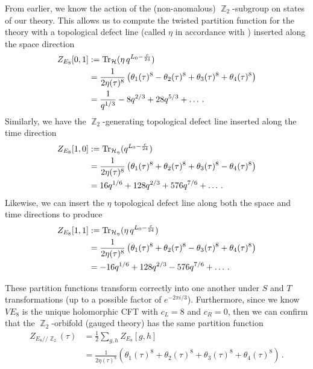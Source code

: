 \documentclass{article}
\DeclareMathOperator{\bbZ}{\mathbb{Z}}
\begin{document}
From earlier, we know the action of the (non-anomalous) $\bbZ_2$-subgroup on states of our theory. This allows us to compute the twisted partition function for the theory with a topological defect line (called $\eta$ in accordance with \cite{monsterCFT}) inserted along the space direction
\begin{align}
    Z_{E_8}[0,1] 
        &:= \Tr_{\mathcal{H}}( \eta \, q^{L_0-\frac{c}{24}})\\
        &= \frac{1}{2\eta(\tau)^8} \left(\theta_1(\tau)^8 - \theta_2(\tau)^8 + \theta_3(\tau)^8 + \theta_4(\tau)^8\right)\\
        &= \frac{1}{q^{1/3}} - 8 q^{2/3} + 28 q^{5/3} + \dots\,.
\end{align}
Similarly, we have the $\bbZ_2$-generating topological defect line inserted along the time direction
\begin{align}
    Z_{E_8}[1,0]
        &:= \Tr_{\mathcal{H}_\eta}(q^{L_0-\frac{c}{24}})\\
        &= \frac{1}{2\eta(\tau)^8} \left(\theta_1(\tau)^8 + \theta_2(\tau)^8 + \theta_3(\tau)^8 - \theta_4(\tau)^8\right)\\
        &= 16q^{1/6} + 128 q^{2/3} + 576 q^{7/6} + \dots\,.
\end{align}
Likewise, we can insert the $\eta$ topological defect line along both the space and time directions to produce
\begin{align}
    Z_{E_8}[1,1]
        &:= \Tr_{\mathcal{H}_\eta}( \eta \, q^{L_0-\frac{c}{24}})\\
        &= \frac{1}{2\eta(\tau)^8} \left(\theta_1(\tau)^8 + \theta_2(\tau)^8 - \theta_3(\tau)^8 + \theta_4(\tau)^8\right)\\
        &= -16q^{1/6} + 128 q^{2/3} - 576 q^{7/6} + \dots\,.
\end{align}

These partition functions transform correctly into one another under $S$ and $T$ transformations (up to a possible factor of $e^{-2\pi i/3}$). Furthermore, since we know $VE_8$ is the unique holomorphic CFT with $c_L = 8$ and $c_R = 0$, then we can confirm that the $\bbZ_2$-orbifold (gauged theory) has the same partition function
\begin{align}
    Z_{E_8//\bbZ_2}(\tau) 
        &= \frac{1}{2} \sum_{g,h} Z_{E_8}[g,h]\\
        &= \frac{1}{2\eta(\tau)^8} \left(\theta_1(\tau)^8 + \theta_2(\tau)^8 + \theta_3(\tau)^8 + \theta_4(\tau)^8\right)\,.
\end{align}
\end{document}
